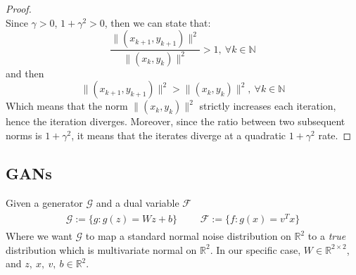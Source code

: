 \documentclass[12pt]{article}
\begin{document}
\begin{proof}
\begin{equation*}
\end{equation*}
Since $\gamma > 0$, $1 + \gamma^{2} > 0$, then we can state that:
\begin{equation*}
    \frac{\lVert (x_{k+1}, y_{k+1}) \rVert ^ 2}{\lVert (x_{k}, y_{k}) \rVert ^{2}} > 1, \ \forall k \in \mathbb{N}
\end{equation*}
and then
\begin{equation}
    \lVert (x_{k+1}, y_{k+1}) \rVert ^ 2 > \lVert (x_{k}, y_{k}) \rVert ^{2}, \ \forall k \in \mathbb{N}
\end{equation}
Which means that the norm $\lVert (x_{k}, y_{k}) \rVert ^{2}$ strictly increases each iteration, hence the iteration diverges. Moreover, since the ratio between two subsequent norms is $1 + \gamma^{2}$, it means that the iterates diverge at a quadratic $1 + \gamma^{2}$ rate.

\end{proof}

\subsection{GANs}

Given a generator $\mathcal{G}$ and a dual variable $\mathcal{F}$
\begin{align}
\begin{aligned} \label{def:gan_funct}
    \mathcal{G}:= \{ g : g(z) = Wz + b \} \ \ \ \ \ \ \  & \mathcal{F} := \{ f : g(x) = v^{T}x \}
\end{aligned}
\end{align}
Where we want $\mathcal{G}$ to map a standard normal noise distribution on $\mathbb{R}^{2}$ to a \emph{true} distribution which is multivariate normal on $\mathbb{R}^{2}$. In our specific case, $W \in \mathbb{R}^{2 \times 2}$, and $z,\ x,\ v,\ b \in \mathbb{R}^{2}$.
\end{document}
